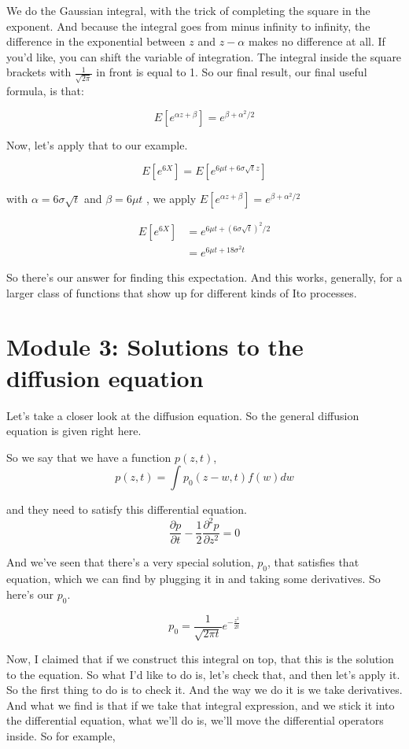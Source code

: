 \documentclass{article}
\begin{document}
We do the Gaussian integral, with the trick of completing the square in the exponent.
And because the integral goes from minus infinity to infinity, the difference in the exponential between $z$ 
and $z-\alpha$ makes no difference at all.
If you'd like, you can shift the variable of integration.
The integral inside the square brackets
with $\frac{1}{\sqrt{2 \pi}}$ in front is equal to 1.
So our final result, our final useful formula, is that:

$$ E[e^{\alpha z + \beta}]  = e^{\beta+ \alpha^2/2}$$

Now, let's apply that to our example.

$$	E[e^{6X}]   = E[e^{ 6\mu t + 6 \sigma \sqrt{t} z}]   $$


with $\alpha=6 \sigma \sqrt{t}$ and $\beta = 6 \mu t$ , we apply $ E[e^{\alpha z + \beta}]  = e^{\beta+ \alpha^2/2}$


\begin{equation*} 
	\begin{split}
		E[e^{6X}] &= e^{6 \mu t + (6 \sigma \sqrt{t})^2/2}  \\
	    &= e^{6 \mu t + 18 \sigma^2 t}  
	\end{split}
\end{equation*}


So there's our answer for finding this expectation.
And this works, generally, for a larger class
of functions that show up for different kinds of Ito
processes.


	\section*{Module 3: Solutions to the diffusion equation}

Let's take a closer look at the diffusion equation. So the general diffusion equation is given right here.

So we say that we have a function $p(z,t)$,
$$ p(z,t) = \int p_0(z-w,t)f(w)dw $$

and they need to satisfy this differential equation.
$$ \frac{\partial p}{\partial t} - \frac{1}{2} \frac{\partial ^2 p}{\partial z^2} = 0 $$

And we've seen that there's a very special solution, $p_0$, that satisfies that equation, which
we can find by plugging it in and taking some derivatives. So here's our $p_0$.


$$ p_0 = \frac{1}{\sqrt{2 \pi t}} e^{-\frac{z^2}{2t}} $$



Now, I claimed that if we construct this integral on top,
that this is the solution to the equation.
So what I'd like to do is, let's check that,
and then let's apply it.
So the first thing to do is to check it.
And the way we do it is we take derivatives.
And what we find is that if we take that integral expression,
and we stick it into the differential equation, what
we'll do is, we'll move the differential operators inside.
So for example,
\end{document}
